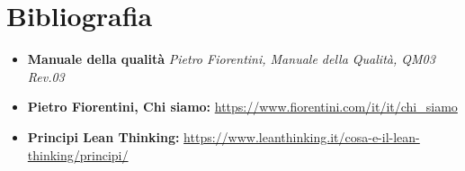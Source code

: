 \chapter*{Bibliografia}

\begin{itemize}[wide=0pt, leftmargin=*]
  
\item[] \textbf{Manuale della qualità}
\textit{Pietro Fiorentini, Manuale della Qualità, QM03 Rev.03}

\item[] \textbf{Pietro Fiorentini, Chi siamo: }  \url{https://www.fiorentini.com/it/it/chi_siamo}

\item[] \textbf{Principi Lean Thinking: } \url{https://www.leanthinking.it/cosa-e-il-lean-thinking/principi/}
\end{itemize}



